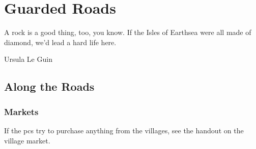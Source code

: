 \chapter{Guarded Roads}
\epigraph{A rock is a good thing, too, you know. If the Isles of Earthsea were all made of diamond, we'd lead a hard life here.}{Ursula Le Guin}

\section{Along the Roads}

\begin{multicols}{2}

\subsection{Markets}

If the \glspl{pc} try to purchase anything from the \glspl{village}, see the handout on the village market.

\end{multicols}

